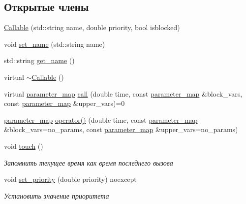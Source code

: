 \subsection*{Открытые члены}
\begin{DoxyCompactItemize}
\item 
\hyperlink{classLIBKMS__namespace_1_1Callable_a2ae113d77b64ace4b5dbc6ac2cb8d22b}{Callable} (std\-::string name, double priority, bool isblocked)
\item 
void \hyperlink{classLIBKMS__namespace_1_1Callable_a3e475788ceb6452ea984ae7c41c173c4}{set\-\_\-name} (std\-::string name)
\item 
std\-::string \hyperlink{classLIBKMS__namespace_1_1Callable_a58a214027a04f1cf8ab9644b9ad57916}{get\-\_\-name} ()
\item 
virtual \hyperlink{classLIBKMS__namespace_1_1Callable_acd80016512d6e1062ae0fe5b4d84776e}{$\sim$\-Callable} ()
\item 
virtual \hyperlink{classLIBKMS__namespace_1_1Callable_ad58caabaa5ac247c9d385e6d5451916a}{parameter\-\_\-map} \hyperlink{classLIBKMS__namespace_1_1Callable_ad9cad480516a054f09c056ae248691b1}{call} (double time, const \hyperlink{classLIBKMS__namespace_1_1Callable_ad58caabaa5ac247c9d385e6d5451916a}{parameter\-\_\-map} \&block\-\_\-vars, const \hyperlink{classLIBKMS__namespace_1_1Callable_ad58caabaa5ac247c9d385e6d5451916a}{parameter\-\_\-map} \&upper\-\_\-vars)=0
\item 
\hyperlink{classLIBKMS__namespace_1_1Callable_ad58caabaa5ac247c9d385e6d5451916a}{parameter\-\_\-map} \hyperlink{classLIBKMS__namespace_1_1Callable_a7838731afe0ac0fee5e88ab64952aa4a}{operator()} (double time, const \hyperlink{classLIBKMS__namespace_1_1Callable_ad58caabaa5ac247c9d385e6d5451916a}{parameter\-\_\-map} \&block\-\_\-vars=no\-\_\-params, const \hyperlink{classLIBKMS__namespace_1_1Callable_ad58caabaa5ac247c9d385e6d5451916a}{parameter\-\_\-map} \&upper\-\_\-vars=no\-\_\-params)
\item 
void \hyperlink{classLIBKMS__namespace_1_1Callable_a300b999c2d5ff9663aeb4cb022a5d79b}{touch} ()
\begin{DoxyCompactList}\small\item\em Запомнить текущее время как время последнего вызова \end{DoxyCompactList}\item 
void \hyperlink{classLIBKMS__namespace_1_1Callable_a42b5186f839fb643c115a7db10b14dbd}{set\-\_\-priority} (double priority) noexcept
\begin{DoxyCompactList}\small\item\em Установить значение приоритета \end{DoxyCompactList}\item 

\end{DoxyCompactItemize}
